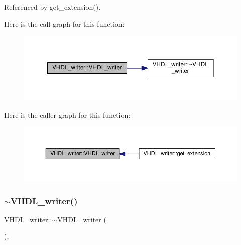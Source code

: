 Referenced by get\+\_\+extension().

Here is the call graph for this function\+:
\nopagebreak
\begin{figure}[H]
\begin{center}
\leavevmode
\includegraphics[width=350pt]{d0/d0c/structVHDL__writer_a710c73d9ba012835d394917ee0a45488_cgraph}
\end{center}
\end{figure}
Here is the caller graph for this function\+:
\nopagebreak
\begin{figure}[H]
\begin{center}
\leavevmode
\includegraphics[width=350pt]{d0/d0c/structVHDL__writer_a710c73d9ba012835d394917ee0a45488_icgraph}
\end{center}
\end{figure}
\mbox{\label{structVHDL__writer_afc4d892a2ca0e9def482be137208a7b5}} 
\subsubsection{\texorpdfstring{$\sim$\+V\+H\+D\+L\+\_\+writer()}{~VHDL\_writer()}}
{\footnotesize\ttfamily V\+H\+D\+L\+\_\+writer\+::$\sim$\+V\+H\+D\+L\+\_\+writer (\begin{DoxyParamCaption}{ }\end{DoxyParamCaption})\hspace{0.3cm}{\ttfamily [override]}, {\ttfamily [default]}}



